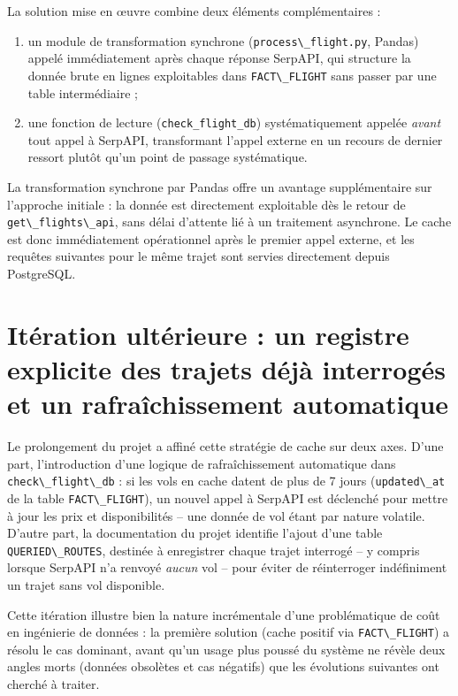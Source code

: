 \documentclass[11pt,a4paper]{report}
\newcommand{\code}[1]{\lstinline{#1}}
\begin{document}
La solution mise en œuvre combine deux éléments complémentaires :

\begin{enumerate}
  \item un module de transformation synchrone (\code{process\_flight.py}, Pandas) appelé immédiatement après chaque réponse SerpAPI, qui structure la donnée brute en lignes exploitables dans \code{FACT\_FLIGHT} sans passer par une table intermédiaire ;
  \item une fonction de lecture (\code{check_flight_db}) systématiquement appelée \emph{avant} tout appel à SerpAPI, transformant l'appel externe en un recours de dernier ressort plutôt qu'un point de passage systématique.
\end{enumerate}

La transformation synchrone par Pandas offre un avantage supplémentaire sur l'approche initiale : la donnée est directement exploitable dès le retour de \code{get\_flights\_api}, sans délai d'attente lié à un traitement asynchrone. Le cache est donc immédiatement opérationnel après le premier appel externe, et les requêtes suivantes pour le même trajet sont servies directement depuis PostgreSQL.

\section{Itération ultérieure : un registre explicite des trajets déjà interrogés et un rafraîchissement automatique}

Le prolongement du projet a affiné cette stratégie de cache sur deux axes. D'une part, l'introduction d'une logique de rafraîchissement automatique dans \code{check\_flight\_db} : si les vols en cache datent de plus de 7 jours (\code{updated\_at} de la table \code{FACT\_FLIGHT}), un nouvel appel à SerpAPI est déclenché pour mettre à jour les prix et disponibilités -- une donnée de vol étant par nature volatile. D'autre part, la documentation du projet identifie l'ajout d'une table \code{QUERIED\_ROUTES}, destinée à enregistrer chaque trajet interrogé -- y compris lorsque SerpAPI n'a renvoyé \emph{aucun} vol -- pour éviter de réinterroger indéfiniment un trajet sans vol disponible.

Cette itération illustre bien la nature incrémentale d'une problématique de coût en ingénierie de données : la première solution (cache positif via \code{FACT\_FLIGHT}) a résolu le cas dominant, avant qu'un usage plus poussé du système ne révèle deux angles morts (données obsolètes et cas négatifs) que les évolutions suivantes ont cherché à traiter.
\end{document}
